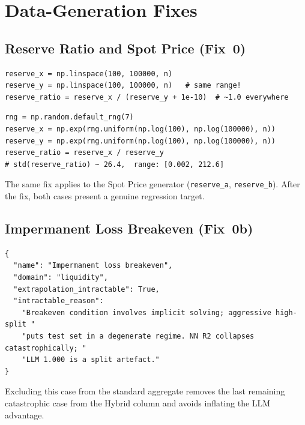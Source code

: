 \documentclass[twoside,11pt]{article}
\begin{document}
\section{Data-Generation Fixes}
\label{sec:data_fixes}

\subsection{Reserve Ratio and Spot Price (Fix~0)}

\begin{lstlisting}[caption={Buggy generator — identical linspace ranges.}]
reserve_x = np.linspace(100, 100000, n)
reserve_y = np.linspace(100, 100000, n)   # same range!
reserve_ratio = reserve_x / (reserve_y + 1e-10)  # ~1.0 everywhere
\end{lstlisting}

\begin{lstlisting}[caption={Fixed generator — independent log-uniform sampling (seed=7).}]
rng = np.random.default_rng(7)
reserve_x = np.exp(rng.uniform(np.log(100), np.log(100000), n))
reserve_y = np.exp(rng.uniform(np.log(100), np.log(100000), n))
reserve_ratio = reserve_x / reserve_y
# std(reserve_ratio) ~ 26.4,  range: [0.002, 212.6]
\end{lstlisting}

The same fix applies to the Spot Price generator
(\texttt{reserve\_a}, \texttt{reserve\_b}).  After the fix, both cases present
a genuine regression target.

\subsection{Impermanent Loss Breakeven (Fix~0b)}

\begin{lstlisting}[caption={Intractable flag added to IL Breakeven catalogue entry.}]
{
  "name": "Impermanent loss breakeven",
  "domain": "liquidity",
  "extrapolation_intractable": True,
  "intractable_reason":
    "Breakeven condition involves implicit solving; aggressive high-split "
    "puts test set in a degenerate regime. NN R2 collapses catastrophically; "
    "LLM 1.000 is a split artefact."
}
\end{lstlisting}

Excluding this case from the standard aggregate removes the last remaining
catastrophic case from the Hybrid column and avoids inflating the LLM
advantage.
\end{document}
